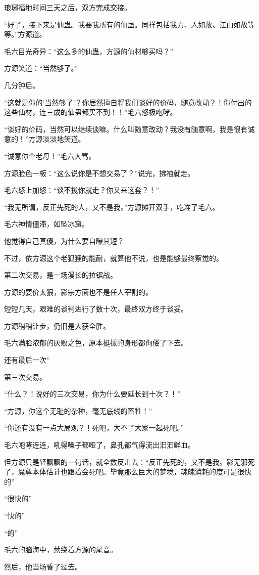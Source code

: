 \begin{this_body}
琅琊福地时间三天之后，双方完成交接。

“好了，接下来是仙蛊。我要我所有的仙蛊。同样包括我力、人如故、江山如故等等。”方源道。

毛六目光奇异：“这么多的仙蛊，方源的仙材够买吗？”

方源笑道：“当然够了。”

几分钟后。

“这就是你的‘当然够了’？你居然擅自将我们谈好的价码，随意改动？！你付出的这些仙材，连三成的仙蛊都买不到！！”毛六怒极咆哮。

“谈好的价码，当然可以继续谈嘛。什么叫随意改动？我没有随意啊，我是很有诚意的！”方源淡淡地笑道。

“诚意你个老母！”毛六大骂。

方源脸色一板：“这么说你是不想交易了？”说完，拂袖就走。

毛六怒上加怒：“谈不拢你就走？你又来这套？！”

“我无所谓，反正先死的人，又不是我。”方源摊开双手，吃准了毛六。

毛六神情僵滞，如坠冰窟。

他觉得自己真傻，为什么要自曝其短？

不过，依方源这个老狐狸的能耐，就算他不说，也是能够最终察觉的。

第二次交易，是一场漫长的拉锯战。

方源的要价太狠，影宗方面也不是任人宰割的。

短短几天，艰难的谈判进行了数十次，最终双方终于谈妥。

方源稍稍让步，仍旧是大获全胜。

毛六满脸浓郁的灰败之色，原本挺拔的身形都佝偻了下去。

还有最后一次”

第三次交易。

“什么？！说好的三次交易，你为什么要延长到十次？！”

“方源，你这个无耻的杂种，毫无底线的畜牲！”

“你还有没有一点大局观？！死吧，大不了大家一起死吧。”

毛六咆哮连连，吼得嗓子都哑了，鼻孔都气得流出汩汩鲜血。

但方源只是轻飘飘的一句话，就全数反击去：“反正先死的，又不是我。影无邪死了，魔尊本体估计也跟着会死吧。毕竟那么巨大的梦境，魂魄消耗的度可是很快的”

“很快的”

“快的”

“的”

毛六的脑海中，萦绕着方源的尾音。

然后，他当场昏了过去。

\end{this_body}

